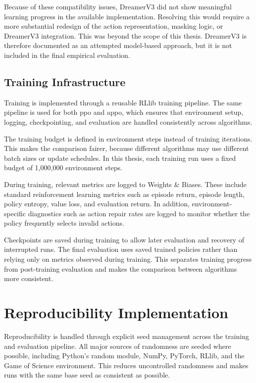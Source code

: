 \documentclass[english,bachelor]{hsluthesis}
\begin{document}
Because of these compatibility issues, DreamerV3 did not show meaningful learning progress in the available implementation. Resolving this would require a more substantial redesign of the action representation, masking logic, or DreamerV3 integration. This was beyond the scope of this thesis. DreamerV3 is therefore documented as an attempted model-based approach, but it is not included in the final empirical evaluation.

\subsection{Training Infrastructure}

Training is implemented through a reusable RLlib training pipeline. The same pipeline is used for both \gls{ppo} and \gls{appo}, which ensures that environment setup, logging, checkpointing, and evaluation are handled consistently across algorithms.

The training budget is defined in environment steps instead of training iterations. This makes the comparison fairer, because different algorithms may use different batch sizes or update schedules. In this thesis, each training run uses a fixed budget of 1,000,000 environment steps.

During training, relevant metrics are logged to Weights \& Biases. These include standard reinforcement learning metrics such as episode return, episode length, policy entropy, value loss, and evaluation return. In addition, environment-specific diagnostics such as action repair rates are logged to monitor whether the policy frequently selects invalid actions.

Checkpoints are saved during training to allow later evaluation and recovery of interrupted runs. The final evaluation uses saved trained policies rather than relying only on metrics observed during training. This separates training progress from post-training evaluation and makes the comparison between algorithms more consistent.

\section{Reproducibility Implementation}

Reproducibility is handled through explicit seed management across the training and evaluation pipeline. All major sources of randomness are seeded where possible, including Python's random module, NumPy, PyTorch, RLlib, and the Game of Science environment. This reduces uncontrolled randomness and makes runs with the same base seed as consistent as possible.
\end{document}
